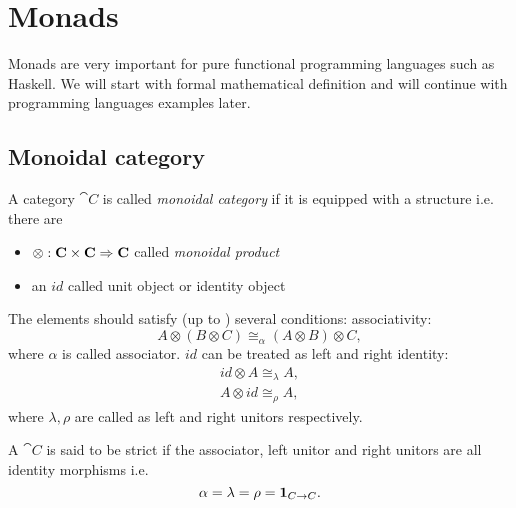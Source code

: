 \chapter{Monads}

Monads are very important for pure functional programming languages
such as Haskell. We will start with formal mathematical definition and
will continue with programming languages examples later.


\section{Monoidal category}

\begin{definition}
\label{def:monoidal_category}
A category $\cat{C}$ is called \textit{monoidal category} if it is
equipped with a  structure i.e. there are
\begin{itemize}
\item {} $\otimes: \mathbf{C} \times \mathbf{C} \Rightarrow
  \mathbf{C}$ called \textit{monoidal product}  
\item an  $id$ called unit object or identity object
\end{itemize}

The elements should satisfy (up to ) several conditions:
associativity: 
\begin{equation}
A \otimes \left( B \otimes C \right) \cong_\alpha
  \left( A \otimes B \right) \otimes C,
\nonumber
\end{equation}
where $\alpha$ is called associator. 
$id$ can be treated as left and right identity: 
\begin{eqnarray}
id \otimes A \cong_\lambda A, 
\nonumber \\
A \otimes id \cong_\rho A,
\nonumber
\end{eqnarray}
where $\lambda, \rho$ are called as left and right unitors respectively.  
\end{definition}


\begin{definition}
\label{def:strict_monoidal_category}
A  $\cat{C}$ is said to be strict if the
associator, left 
unitor and right unitors are all identity morphisms i.e.
\[
\alpha = \lambda = \rho = \mathbf{1}_{ C \to C }.
\]
 
\end{definition}

